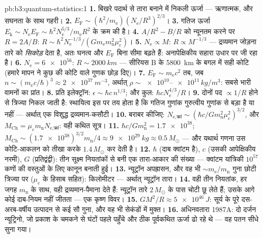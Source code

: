 \begin{solution}{pb:b3:quantum-statistics:1}
\textbf{1.} बिखरे पदार्थ से तारा बनाने में निकली ऊर्जा ---
ऋणात्मक, और सघनता के साथ गहरी।
\textbf{2.} $E_{\text{F}} \sim (\hbar^2/m_{\text{e}})
(N_{\text{e}}/R^3)^{2/3}$।
\textbf{3.} गतिज ऊर्जा $E_{\text{k}} \sim N_{\text{e}}E_{\text{F}} \sim
\hbar^2N_{\text{e}}^{5/3}/m_{\text{e}}R^2$ के क्रम की है।
\textbf{4.} $A/R^2 - B/R$ को न्यूनतम करने पर $R = 2A/B$: $R \sim
\hbar^2N_{\text{e}}^{-1/3}/(Gm_{\text{e}}m_{\text{n}}^2\mu_e^2)$।
\textbf{5.} $N_{\text{e}} \propto M$: $R \propto M^{-1/3}$ ---
द्रव्यमान जोड़ना तारे को \emph{सिकोड़} देता है, अतः घनत्व और
$E_{\text{F}}$ बिना सीमा बढ़ते हैं: अनापेक्षिकीय सहारा उधार पर जी
रहा है।
\textbf{6.} $N_{\text{e}} = \num{6e56}$: $R \sim \qty{2000}{km}$
--- सीरियस B के \qty{5800}{km} के बगल में सही कोटि (हमारे मापन ने
कुछ की कोटि वाले गुणक छोड़ दिए)।
\textbf{7.} $E_{\text{F}} \sim m_{\text{e}}c^2$ तब, जब $n \sim
(m_{\text{e}}c/\hbar)^3 \approx \qty{2e37}{m^{-3}}$, अर्थात् $\rho
\sim \num{e10}$--$\num{e11}\,\unit{kg/m^3}$: सबसे भारी वामनों का
प्रांत।
\textbf{8.} प्रति इलेक्ट्रॉन: $\epsilon \sim \hbar c\,n^{1/3}$;
और कुल: $\hbar cN_{\text{e}}^{4/3}/R$।
\textbf{9.} दोनों पद $\propto 1/R$ होने से त्रिज्या निकल जाती है:
स्थायित्व इस पर तय होता है कि गतिज गुणांक गुरुत्वीय गुणांक से
बड़ा है या नहीं --- अर्थात् एक विशुद्ध द्रव्यमान-कसौटी।
\textbf{10.} बराबर कीजिए: $N_{\text{e,क्रां}} \sim (\hbar c/
Gm_{\text{n}}^2\mu_e^2)^{3/2}$, और $M_{\text{Ch}} =
\mu_em_{\text{n}}N_{\text{e,क्रां}}$: वही कथित सूत्र।
\textbf{11.} $\hbar c/Gm_{\text{n}}^2 = \num{1.7e38}$;
$M_{\text{Ch}} \sim (\num{1.7e38})^{3/2}m_{\text{n}}/4 \approx
\qty{9e29}{kg} \approx 0.5\,M_\odot$ --- और यथार्थ गणना उस
कोटि-आकलन को तीखा करके $1.4\,M_\odot$ कर देती है।
\textbf{12.} $\hbar$ (दाब क्वांटम है), $c$ (उसकी
आपेक्षिकीय नरमी), $G$ (प्रतिद्वंद्वी): तीन सूक्ष्म नियतांकों से बनी
एक तारा-आकार की संख्या --- क्वांटम यांत्रिकी
$10^{57}$ कणों की वस्तुओं के लिए कानून बनाती हुई।
\textbf{13.} न्यूट्रॉन अपह्रासन, और वह भी
$\sim m_{\text{e}}/m_{\text{n}}$ गुना छोटी त्रिज्या पर ($\mu_e$ के
हिसाब सहित): किलोमीटर --- अर्थात् न्यूट्रॉन तारा।
\textbf{14.} वही तीन नियतांक, हर जगह $m_{\text{n}}$ के साथ, वही
द्रव्यमान-पैमाना देते हैं: न्यूट्रॉन तारे
$2\,M_\odot$ के पास चोटी छू लेते हैं; उसके आगे कोई दाब-नियम नहीं
जीतता --- एक कृष्ण विवर।
\textbf{15.} $GM^2/R \approx \qty{5e46}{J}$: सूर्य के पूरे
दस-अरब-वर्षीय उत्पादन से कई सौ गुना, और वह भी सेकंडों में मुक्त।
\textbf{16.} अधिनवतारा 1987A: दो दर्जन न्यूट्रिनो, जो प्रकाश के
चमकने से घंटों पहले पहुँचे और ठीक पूर्वकथित ऊर्जा ढो रहे थे
--- वह पतन सीधे सुना गया।

\end{solution}
